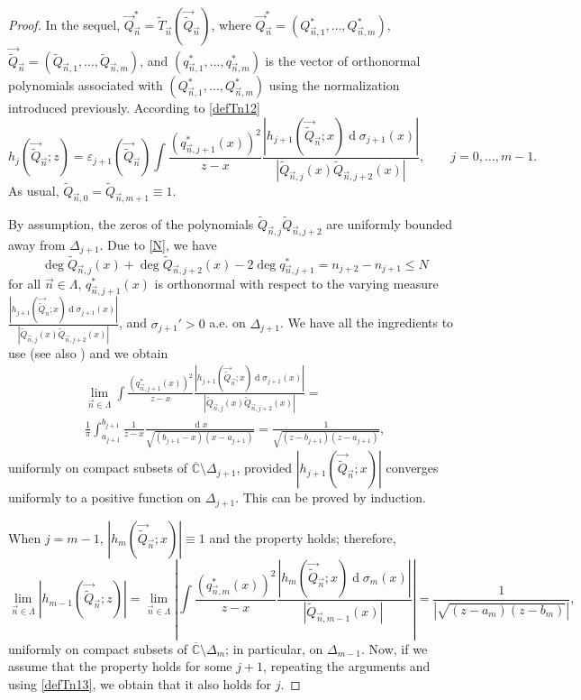 \documentclass{amsart}
\numberwithin{equation}{section}
\theoremstyle{definition}
\DeclareMathOperator{\D}{d}        %
\newcommand{\CC}{\mathbb{C}}      %
\newcommand{\n}{\vec{n}}          %
\begin{document}
    \begin{proof}
    In the sequel, $\vec{{Q}}_{\n}^* = \tilde{T}_{\n}(\vec{\tilde{Q}}_{\n} )$, where $\vec{{Q}}_{\n}^* = ({Q}_{\n,1}^* ,\ldots,{Q}_{\n,m}^* )$, $\vec{\tilde{Q}}_{\n} = (\tilde{Q}_{\n,1},\ldots,\tilde{Q}_{\n,m})$, and $({q}_{\n,1}^* ,\ldots,{q}_{\n,m}^* )$ is the vector of orthonormal polynomials associated with $({Q}_{\n,1}^* ,\ldots,{Q}_{\n,m}^* )$ using the normalization introduced previously. According to \eqref{defTn12}
    \begin{equation}
        \label{defTn13}
        {h}_{j}( {\vec{\tilde{Q}}}_{\n};z) = \varepsilon_{j+1}(\vec{\tilde{Q}}_{\n})\int \frac{(q^*_{\n,j+1}(x))^2}{z-x}\frac{| {h}_{j+1}( {\vec{\tilde{Q}}}_{\n};x)\D\sigma_{j+1}(x)|}{|\tilde{Q}_{\n,j}(x) \tilde{Q}_{\n,j+2}(x)|}, \qquad j=0,\ldots,m-1.
    \end{equation}
    As usual, $\tilde{Q}_{\n,0} = \tilde{Q}_{\n,m+1} \equiv 1$.

   By assumption, the zeros of the polynomials $\tilde{Q}_{\n,j} \tilde{Q}_{\n,j+2}$ are uniformly bounded away from $\Delta_{j+1}$. Due to \eqref{N}, we have
    \[ \deg\tilde{Q}_{\n,j}(x) + \deg \tilde{Q}_{\n,j+2}(x)-2\deg q^*_{\n,j+1} = n_{j+2}-n_{j+1} \leq N
    \]
    for all $\n \in \Lambda$,  $q^*_{\n,j+1}(x)$ is orthonormal with respect to the varying measure $\frac{| {h}_{j+1}( {\vec{\tilde{Q}}}_n;x)\D\sigma_{j+1}(x)|}{|\tilde{Q}_{\n,j}(x) \tilde{Q}_{\n,j+2}(x)|}$, and $\sigma_{j+1}' > 0$ a.e. on $\Delta_{j+1}$. We have all the ingredients to use \cite[Theorem 8]{bernardo_lago1} (see also \cite{lagober98}) and we obtain
    \begin{multline*}
        \lim_{\n \in \Lambda} \int \frac{(q^*_{\n,j+1}(x))^2}{z-x}\frac{| {h}_{j+1}( {\vec{\tilde{Q}}}_{\n};x)\D\sigma_{j+1}(x)|}{|\tilde{Q}_{\n,j}(x) \tilde{Q}_{\n,j+2}(x)|} = \\
        \frac{1}{\pi} \int_{a_{j+1}}^{b_{j+1}} \frac{1}{z-x} \frac{\D x}{\sqrt{(b_{j+1}-x)(x-a_{j+1})}} = \frac{1}{\sqrt{(z-b_{j+1})(z - a_{j+1})}},
    \end{multline*}
    uniformly on compact subsets of $\overline{\CC} \setminus \Delta_{j+1}$, provided   $|{h}_{j+1}( {\vec{\tilde{Q}}}_{\n};x)|$ converges uniformly to a positive function on $\Delta_{j+1}$. This can be proved by induction.

When $j=m-1$, $|{h}_{m}( {\vec{\tilde{Q}}}_{\n};x)| \equiv 1$ and the property holds; therefore,
\[
  \lim_{\n \in \Lambda} |{h}_{m-1}( {\vec{\tilde{Q}}}_{\n};z)| =\lim_{\n \in \Lambda}  \left|\int \frac{(q^*_{\n,m}(x))^2}{z-x}\frac{| {h}_{m}( {\vec{\tilde{Q}}}_{\n};x) \D\sigma_{m}(x)|}{|\tilde{Q}_{\n,m-1}(x)|~}\right| =  \frac{1}{|\sqrt{(z-a_m)(z-b_m)}|} ,
\]
uniformly on compact subsets of $\overline{\CC} \setminus \Delta_m$; in particular, on $\Delta_{m-1}$. Now, if we assume that the property holds for some $j+1$, repeating the arguments and using \eqref{defTn13}, we obtain that it also holds for $j$.
\end{proof}
\end{document}
